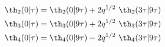 \begin{equation}
    \begin{split}
      \th_2(0|\tau) &= \th_2(0|9\tau) + 2q^{1/2}~\th_2(3\tau|9\tau) \\
      \th_3(0|\tau) &= \th_3(0|9\tau) + 2q^{1/2}~\th_3(3\tau|9\tau) \\
      \th_4(0|\tau) &= \th_4(0|9\tau) - 2q^{1/2}~\th_4(3\tau|9\tau) \\
    \end{split}
  \end{equation}

